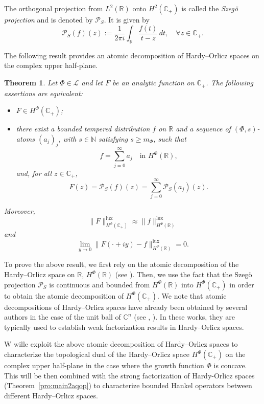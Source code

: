 \documentclass[a4paper,12pt,intlimits,oneside]{amsart}
\newtheorem{theorem}{Theorem}[section]
\theoremstyle{definition}
\numberwithin{equation}{section}
\theoremstyle{definition}
\begin{document}
\medskip

The orthogonal projection from $L^2(\mathbb{R})$ onto $H^2(\mathbb{C}_+)$ is called the \emph{Szeg\"o projection} and is denoted by $\mathcal{P}_S$. It is given by
\[
\mathcal{P}_S(f)(z) := \frac{1}{2\pi i} \int_{\mathbb{R}} \frac{f(t)}{t - z}\, dt, \quad \forall z \in \mathbb{C}_+.
\]

\medskip

The following result provides an atomic decomposition of Hardy--Orlicz spaces on the complex upper half-plane.

\begin{theorem}\label{pro:main6maqmq4}
Let $\Phi \in \mathscr{L}$ and let $F$ be an analytic function on $\mathbb{C}_+$. The following assertions are equivalent:
\begin{itemize}
\item[(i)] $F \in H^\Phi(\mathbb{C}_+)$;
\item[(ii)] there exist a bounded tempered distribution $f$ on $\mathbb{R}$ and a sequence of $(\Phi,s)$-atoms $(a_j)_j$, with $s \in \mathbb{N}$ satisfying $s \geq m_\Phi$, such that
\[
f = \sum_{j=0}^\infty a_j \quad \text{in } H^\Phi(\mathbb{R}),
\]
and, for all $z \in \mathbb{C}_+$,
\[
F(z) = \mathcal{P}_S(f)(z) = \sum_{j=0}^\infty \mathcal{P}_S(a_j)(z).
\]
\end{itemize}
Moreover,
\[
\|F\|_{H^\Phi(\mathbb{C}_+)}^{\mathrm{lux}} \approx \|f\|_{H^\Phi(\mathbb{R})}^{\mathrm{lux}}
\]
and
\[
\lim_{y \to 0} \|F(\cdot + i y) - f\|_{H^\Phi(\mathbb{R})}^{\mathrm{lux}} = 0.
\]
\end{theorem}

To prove the above result, we first rely on the atomic decomposition of the Hardy--Orlicz space on $\mathbb{R}$, $H^\Phi(\mathbb{R})$ (see \cite{yangLiangKy}). Then, we use the fact that the Szeg\"o projection $\mathcal{P}_S$ is continuous and bounded from $H^\Phi(\mathbb{R})$ into $H^\Phi(\mathbb{C}_{+})$ in order to obtain the atomic decomposition of $H^\Phi(\mathbb{C}_{+})$.
We note that atomic decompositions of Hardy--Orlicz spaces have already been obtained by several authors in the case of the unit ball of $\mathbb{C}^n$ (see \cite{BoGre}, \cite{BoGreseh}). In these works, they are typically used to establish weak factorization results in Hardy--Orlicz spaces.

\medskip

 W wille exploit the above atomic decomposition of Hardy--Orlicz spaces to characterize the topological dual of the Hardy--Orlicz space \(H^{\Phi}(\mathbb{C}_{+})\) on the complex upper half-plane in the case where the growth function \(\Phi\) is concave. This will be then combined with the strong factorization of Hardy-Orlicz spaces (Theorem~\ref{pro:main2aqop}) to characterize bounded Hankel operators between different Hardy--Orlicz spaces. 
\end{document}
